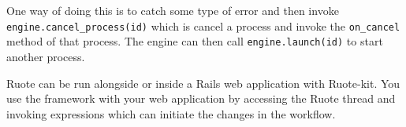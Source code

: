 
One way of doing this is to catch some type of error and then invoke \verb!engine.cancel_process(id)! which is cancel a process and invoke the \verb!on_cancel! method of that process. The engine can then call \verb!engine.launch(id)! to start another process.


Ruote can be run alongside or inside a Rails web application with Ruote-kit. You use the framework with your web application by accessing the Ruote thread and invoking expressions which can initiate the changes in the workflow.
